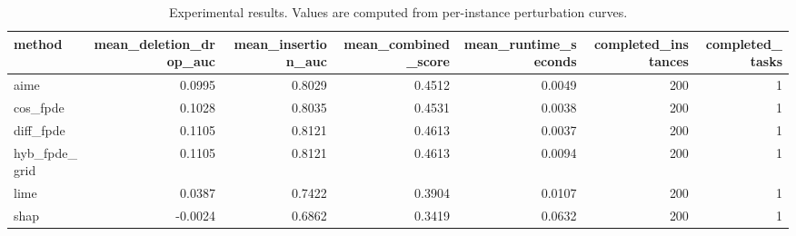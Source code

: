 \begin{table}[t]
\caption{Experimental results. Values are computed from per-instance perturbation curves.}
\label{tab:main_results_computed}
\centering
\begin{tabular}{lrrrrrr}
\toprule
method & mean\_deletion\_drop\_auc & mean\_insertion\_auc & mean\_combined\_score & mean\_runtime\_seconds & completed\_instances & completed\_tasks \\
\midrule
aime & 0.0995 & 0.8029 & 0.4512 & 0.0049 & 200 & 1 \\
cos\_fpde & 0.1028 & 0.8035 & 0.4531 & 0.0038 & 200 & 1 \\
diff\_fpde & 0.1105 & 0.8121 & 0.4613 & 0.0037 & 200 & 1 \\
hyb\_fpde\_grid & 0.1105 & 0.8121 & 0.4613 & 0.0094 & 200 & 1 \\
lime & 0.0387 & 0.7422 & 0.3904 & 0.0107 & 200 & 1 \\
shap & -0.0024 & 0.6862 & 0.3419 & 0.0632 & 200 & 1 \\
\bottomrule
\end{tabular}

\end{table}
